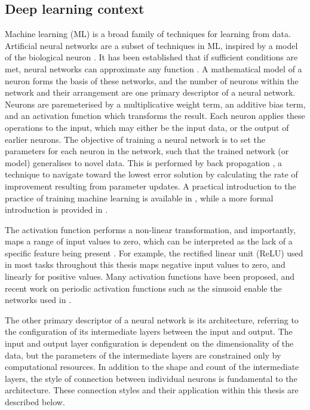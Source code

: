 \subsection{Deep learning context}
Machine learning (ML) is a broad family of techniques for learning from data.
Artificial neural networks are a subset of techniques in ML, inspired by a model of the biological neuron \parencite{bishopNeuralNetworksPattern1995}.
It has been established that if sufficient conditions are met, neural networks can approximate any function \parencite{hornikMultilayerFeedforwardNetworks1989}.
A mathematical model of a neuron forms the basis of these networks, and the number of neurons within the network and their arrangement are one primary descriptor of a neural network.
Neurons are paremeterised by a multiplicative weight term, an additive bias term, and an activation function which transforms the result.
Each neuron applies these operations to the input, which may either be the input data, or the output of earlier neurons.
The objective of training a neural network is to set the parameters for each neuron in the network, such that the trained network (or model) generalises to novel data.
This is performed by back propagation \parencite{rumelhartLearningRepresentationsBackpropagating1988}, a technique to navigate toward the lowest error solution by calculating the rate of improvement resulting from parameter updates.
A practical introduction to the practice of training machine learning is available in \textcite{stevensDeepLearningPyTorch2020}, while a more formal introduction is provided in \textcite{bishopPatternRecognitionMachine2006}.

The activation function performs a non-linear transformation, and importantly, maps a range of input values to zero, which can be interpreted as the lack of a specific feature being present \parencite{williamsLogicActivationFunctions1986}.
For example, the rectified linear unit (ReLU) used in most tasks throughout this thesis maps negative input values to zero, and linearly for positive values.
Many activation functions have been proposed, and recent work on periodic activation functions such as the sinusoid \parencite{sitzmann2019siren} enable the networks used in .

The other primary descriptor of a neural network is its architecture, referring to the configuration of its intermediate layers between the input and output.
The input and output layer configuration is dependent on the dimensionality of the data, but the parameters of the intermediate layers are constrained only by computational resources.
In addition to the shape and count of the intermediate layers, the style of connection between individual neurons is fundamental to the architecture. 
These connection styles and their application within this thesis are described below.

